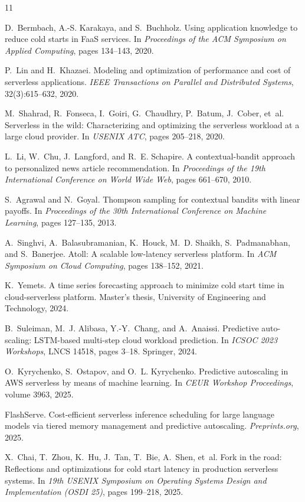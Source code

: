 \documentclass[11pt]{article}
\begin{document}
\begin{thebibliography}{11}

D.~Bermbach, A.-S. Karakaya, and S.~Buchholz.
\newblock Using application knowledge to reduce cold starts in FaaS services.
\newblock In \emph{Proceedings of the ACM Symposium on Applied Computing}, pages 134--143, 2020.

P.~Lin and H.~Khazaei.
\newblock Modeling and optimization of performance and cost of serverless applications.
\newblock \emph{IEEE Transactions on Parallel and Distributed Systems}, 32(3):615--632, 2020.

M.~Shahrad, R.~Fonseca, I.~Goiri, G.~Chaudhry, P.~Batum, J.~Cober, et~al.
\newblock Serverless in the wild: Characterizing and optimizing the serverless workload at a large cloud provider.
\newblock In \emph{USENIX ATC}, pages 205--218, 2020.

L.~Li, W.~Chu, J.~Langford, and R.~E. Schapire.
\newblock A contextual-bandit approach to personalized news article recommendation.
\newblock In \emph{Proceedings of the 19th International Conference on World Wide Web}, pages 661--670, 2010.

S.~Agrawal and N.~Goyal.
\newblock Thompson sampling for contextual bandits with linear payoffs.
\newblock In \emph{Proceedings of the 30th International Conference on Machine Learning}, pages 127--135, 2013.

A.~Singhvi, A.~Balasubramanian, K.~Houck, M.~D. Shaikh, S.~Padmanabhan, and S.~Banerjee.
\newblock Atoll: A scalable low-latency serverless platform.
\newblock In \emph{ACM Symposium on Cloud Computing}, pages 138--152, 2021.

K.~Yemets.
\newblock A time series forecasting approach to minimize cold start time in cloud-serverless platform.
\newblock Master's thesis, University of Engineering and Technology, 2024.

B.~Suleiman, M.~J. Alibasa, Y.-Y.~Chang, and A.~Anaissi.
\newblock Predictive auto-scaling: LSTM-based multi-step cloud workload prediction.
\newblock In \emph{ICSOC 2023 Workshops}, LNCS 14518, pages 3--18. Springer, 2024.

O.~Kyrychenko, S.~Ostapov, and O.~L. Kyrychenko.
\newblock Predictive autoscaling in AWS serverless by means of machine learning.
\newblock In \emph{CEUR Workshop Proceedings}, volume 3963, 2025.

FlashServe.
\newblock Cost-efficient serverless inference scheduling for large language models via tiered memory management and predictive autoscaling.
\newblock \emph{Preprints.org}, 2025.

X.~Chai, T.~Zhou, K.~Hu, J.~Tan, T.~Bie, A.~Shen, et~al.
\newblock Fork in the road: Reflections and optimizations for cold start latency in production serverless systems.
\newblock In \emph{19th USENIX Symposium on Operating Systems Design and Implementation (OSDI 25)}, pages 199--218, 2025.

\end{thebibliography}
\end{document}
